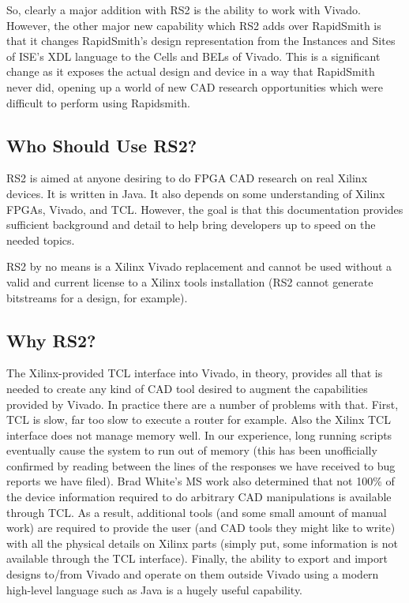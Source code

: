 \documentclass[12pt]{article}
\begin{document}
So, clearly a major addition with RS2 is the ability to work with Vivado. 
However, the other major new capability which RS2 adds over RapidSmith is that
it changes RapidSmith’s design representation from the Instances and Sites of
ISE’s XDL language to the Cells and BELs of Vivado.   This is a significant
change as it exposes the actual design and device in a way that RapidSmith never
did, opening up a world of new CAD research opportunities which were difficult
to perform using Rapidsmith.
       
\subsection{Who Should Use RS2?}
RS2 is aimed at anyone desiring to do FPGA CAD research on real Xilinx devices. 
It is written in Java. It also depends on some understanding of Xilinx FPGAs,
Vivado, and TCL.  However, the goal is that this documentation provides
sufficient background and detail to help bring developers up to speed on the
needed topics.    

RS2 by no means is a Xilinx Vivado replacement and cannot be used without a
valid and current license to a Xilinx tools installation (RS2 cannot generate
bitstreams for a design, for example).     

\subsection{Why RS2?}
The Xilinx-provided TCL interface into Vivado, in theory, provides all that is
needed to create any kind of CAD tool desired to augment the capabilities
provided by Vivado.  In practice there are a number of problems with that.
First, TCL is slow, far too slow to execute a router for example.  Also the
Xilinx TCL interface does not manage memory well.  In our experience, long
running scripts eventually cause the system to run out of memory (this has been
unofficially confirmed by reading between the lines of the responses we have
received to bug reports we have filed).  Brad White’s MS work also determined
that not 100\% of the device information required to do arbitrary CAD
manipulations is available through TCL.  As a result, additional tools (and
some small amount of manual work) are required to provide the user (and CAD
tools they might like to write) with all the physical details on Xilinx parts
(simply put, some information is not available through the TCL interface). 
Finally, the ability to export and import designs to/from Vivado and operate
on them outside Vivado using a modern high-level language such as Java is a
hugely useful capability.
\end{document}
